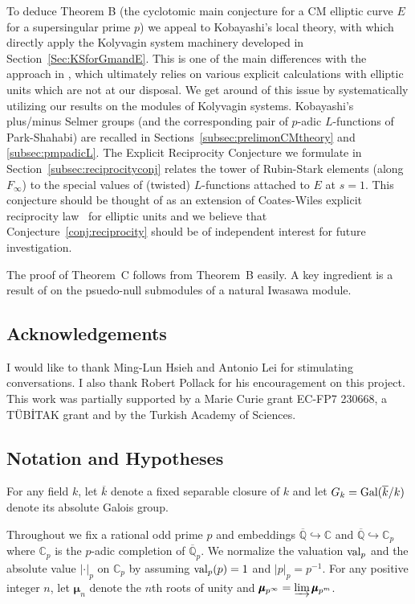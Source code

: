 \documentclass[12pt]{amsart}
\numberwithin{equation}{section}
\begin{document}
To deduce Theorem B (the cyclotomic main conjecture for a CM elliptic curve $E$ for a supersingular prime $p$) we appeal to Kobayashi's local theory, with which directly apply the Kolyvagin system machinery developed in Section~\ref{Sec:KSforGmandE}. This is one of the main differences with the approach in \cite{pollackrubin}, which ultimately relies on various explicit calculations with elliptic units which are not at our disposal. We get around of this issue by systematically utilizing our results on the modules of Kolyvagin systems. Kobayashi's plus/minus Selmer groups (and the corresponding pair of $p$-adic $L$-functions of Park-Shahabi) are recalled in Sections~\ref{subsec:prelimonCMtheory} and \ref{subsec:pmpadicL}. The Explicit Reciprocity Conjecture we formulate in Section~\ref{subsec:reciprocityconj} relates the tower of Rubin-Stark elements (along $F_\infty$) to the special values of (twisted) $L$-functions attached to $E$ at $s=1$. This conjecture should be thought of as an extension of Coates-Wiles explicit reciprocity law~\cite{coateswiles77, wiles78reciprocity} for elliptic units and we believe that Conjecture~\ref{conj:reciprocity} should be of independent interest for future investigation. 

The proof of Theorem~C follows from Theorem~B easily. A key ingredient is a result of \cite{ng} on the psuedo-null submodules of a natural Iwasawa module. 

\subsection*{Acknowledgements}
I would like to thank Ming-Lun Hsieh and Antonio Lei for stimulating  conversations. I also thank Robert Pollack for his encouragement on this project. This work was partially supported by a Marie Curie grant EC-FP7 230668,  a T\"UB\.ITAK grant and by the Turkish Academy of Sciences. 

\subsection{Notation and Hypotheses}
\label{subsec:notation}
For any field $k$, let $\overline{k}$ denote a fixed separable closure of $k$ and let $G_k=\textup{Gal}(\overline{k}/k)$ denote its absolute Galois group.

Throughout we fix a rational odd prime $p$ and embeddings $\overline{\mathbb{Q}}\hookrightarrow \mathbb{C}$ and $\overline{\mathbb{Q}} \hookrightarrow\mathbb{C}_p$ where $\mathbb{C}_p$ is the $p$-adic completion of $\overline{\mathbb{Q}}_p$. We normalize the valuation $\textup{val}_p$ and the absolute value $|\cdot|_p$ on $\mathbb{C}_p$ by assuming $\textup{val}_p(p)=1$ and $|p|_p=p^{-1}$. For any positive integer $n$, let $\pmb{\mu}_{n}$ denote the $n$th roots of unity and $\pmb{\mu}_{p^\infty}=\varinjlim \pmb{\mu}_{p^m}$.
\end{document}
